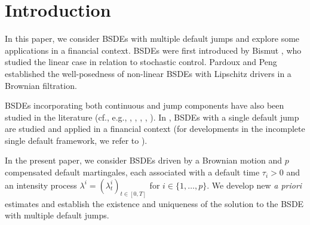 \documentclass[11pt,a4paper]{article}
\numberwithin{equation}{section}
\theoremstyle{newPlain}
\theoremstyle{newDefinition}
\theoremstyle{newRemark}
\begin{document}
\section{Introduction}\label{intro}



In this paper, we consider BSDEs with multiple default jumps and explore some applications in a financial context. BSDEs were first introduced by Bismut \cite{bismut1973conjugate}, who studied the linear case in relation to stochastic control. Pardoux and Peng \cite{pardoux1990adapted} established the well-posedness of non-linear BSDEs with Lipschitz drivers in a Brownian filtration.

BSDEs incorporating both continuous and jump components have also been studied in the literature (cf., e.g., \cite{royer2006bsdejumps}, \cite{quenez2013bsdejumps}, \cite{becherer2017monotone},  \cite{dumitrescu2018bsdes}, \cite{papapantoleon2016existence}). %
In \cite{dumitrescu2018bsdes}, BSDEs with a single default jump are studied and applied in a financial context (for developments in the incomplete single default framework, we refer to \cite{grigorova2020european, grigorova2021american}). %

In the present paper, we consider BSDEs driven by a Brownian motion and $p$ compensated default martingales, each associated with a default time $\tau_i > 0$ and an intensity process $\lambda^i = (\lambda_t^i)_{t \in [0, T]}$ for $i \in \{1, \ldots, p\}$. We develop new \emph{a priori} estimates and establish the existence and uniqueness of the solution to the BSDE with multiple default jumps.
\end{document}
